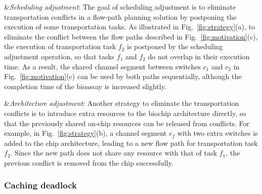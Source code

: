\begin{easylist}
&\textit{Scheduling adjustment}: The goal of scheduling adjustment is to eliminate transportation conflicts in a flow-path planning solution by postponing the execution of some transportation tasks. As illustrated in Fig.~\ref{fig:strategy}(a), to eliminate the conflict between the flow paths described in Fig.~\ref{fig:motivation}(c), the execution of transportation task $f_2$ is postponed by the scheduling adjustment operation, so that tasks $f_1$ and $f_2$ do not overlap in their execution time. As a result, the shared channel segment between switches $c_1$ and $c_2$ in Fig.~\ref{fig:motivation}(c) can be used by both paths sequentially, although the completion time of the bioassay is increased slightly.

&\textit{Architecture adjustment}: Another strategy to eliminate the transportation conflicts is to introduce extra resources to the biochip architecture directly, so that the previously shared on-chip resources can be released from conflicts. For example, in Fig.~\ref{fig:strategy}(b), a channel segment $e_f$ with two extra switches is added to the chip architecture, leading to a new flow path for transportation task $f_2$. Since the new path does not share any resource with that of task $f_1$, the previous conflict is removed from the chip successfully.

\end{easylist}

\subsubsection{Caching deadlock}

